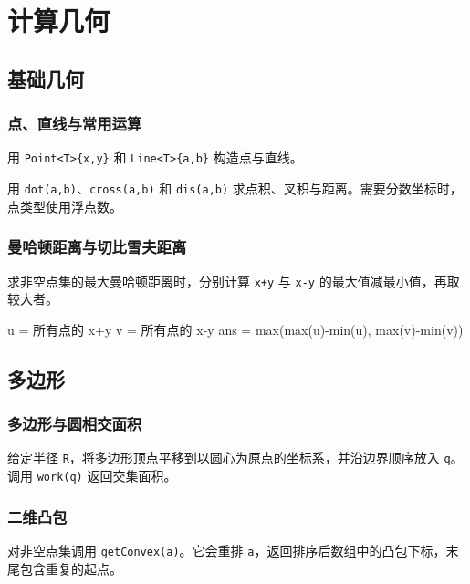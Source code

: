 \chapter{计算几何}

\section{基础几何}

\subsection{点、直线与常用运算}

用 \texttt{Point<T>\{x,y\}} 和 \texttt{Line<T>\{a,b\}} 构造点与直线。

用 \texttt{dot(a,b)}、\texttt{cross(a,b)} 和 \texttt{dis(a,b)} 求点积、叉积与距离。需要分数坐标时，点类型使用浮点数。


\subsection{曼哈顿距离与切比雪夫距离}

求非空点集的最大曼哈顿距离时，分别计算 \texttt{x+y} 与 \texttt{x-y} 的最大值减最小值，再取较大者。

\begin{pseudocode}
u = 所有点的 x+y
v = 所有点的 x-y
ans = max(max(u)-min(u), max(v)-min(v))
\end{pseudocode}

\section{多边形}

\subsection{多边形与圆相交面积}

给定半径 \texttt{R}，将多边形顶点平移到以圆心为原点的坐标系，并沿边界顺序放入 \texttt{q}。调用 \texttt{work(q)} 返回交集面积。


\subsection{二维凸包}

对非空点集调用 \texttt{getConvex(a)}。它会重排 \texttt{a}，返回排序后数组中的凸包下标，末尾包含重复的起点。

